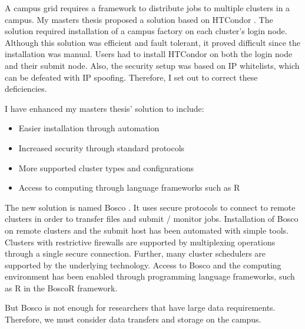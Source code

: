 A campus grid requires a framework to distribute jobs to multiple clusters in a campus.  My masters thesis \cite{weitzel2011campus} proposed a solution based on HTCondor \cite{litzkow1988condor}.  The solution required installation of a campus factory \cite{website:campusfactory} on each cluster's login node.  Although this solution was efficient and fault tolerant, it proved difficult since the installation was manual.  Users had to install HTCondor on both the login node and their submit node.  Also, the security setup was based on IP whitelists, which can be defeated with IP spoofing.  Therefore, I set out to correct these deficiencies.

I have enhanced my masters thesis' solution to include:
\begin{itemize}
\item Easier installation through automation
\item Increased security through standard protocols
\item More supported cluster types and configurations
\item Access to computing through language frameworks such as R \cite{team2005r}
\end{itemize}

The new solution is named Bosco \cite{chep2013weitzel}.  It uses secure protocols to connect to remote clusters in order to transfer files and submit / monitor jobs.  Installation of Bosco on remote clusters and the submit host has been automated with simple tools.  Clusters with restrictive firewalls are supported by multiplexing operations through a single secure connection.  Further, many cluster schedulers are supported by the underlying technology.  Access to Bosco and the computing environment has been enabled through programming language frameworks, such as R in the BoscoR  framework.

But Bosco is not enough for researchers that have large data requirements.  Therefore, we must consider data transfers and storage on the campus.





